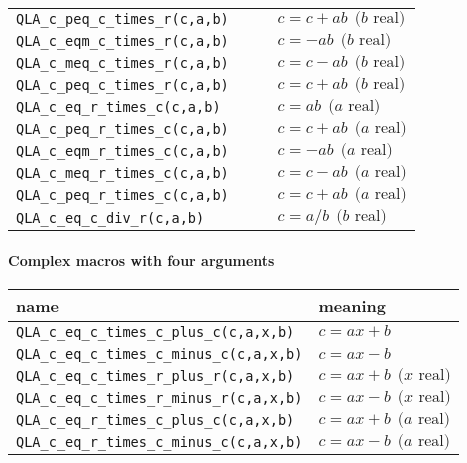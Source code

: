 \documentclass{article}
\begin{document}
\begin{center}
\begin{tabular}{|l|l|}
\verb|QLA_c_peq_c_times_r(c,a,b)    | & $ c = c + ab \ \ \mbox{($b$ real)}$ \\
\verb|QLA_c_eqm_c_times_r(c,a,b)    | & $ c = -ab \ \ \mbox{($b$ real)}   $ \\
\verb|QLA_c_meq_c_times_r(c,a,b)    | & $ c = c - ab \ \ \mbox{($b$ real)}$ \\
\verb|QLA_c_peq_c_times_r(c,a,b)    | & $ c = c + ab \ \ \mbox{($b$ real)}$ \\
\verb|QLA_c_eq_r_times_c(c,a,b)     | & $ c = ab \ \ \mbox{($a$ real)}    $ \\
\verb|QLA_c_peq_r_times_c(c,a,b)    | & $ c = c + ab \ \ \mbox{($a$ real)}$ \\
\verb|QLA_c_eqm_r_times_c(c,a,b)    | & $ c = -ab \ \ \mbox{($a$ real)}   $ \\
\verb|QLA_c_meq_r_times_c(c,a,b)    | & $ c = c - ab \ \ \mbox{($a$ real)}$ \\
\verb|QLA_c_peq_r_times_c(c,a,b)    | & $ c = c + ab \ \ \mbox{($a$ real)}$ \\
\verb|QLA_c_eq_c_div_r(c,a,b)       | & $ c = a/b \ \ \mbox{($b$ real)}   $ \\
\hline
\end{tabular}
\end{center}

\paragraph{Complex macros with four arguments}

\begin{center}
\begin{tabular}{|l|l|}
\hline
  name           & meaning      \\
\hline
\verb|QLA_c_eq_c_times_c_plus_c(c,a,x,b) | & $c = ax + b                   $\\
\verb|QLA_c_eq_c_times_c_minus_c(c,a,x,b)| & $c = ax - b                   $\\
\verb|QLA_c_eq_c_times_r_plus_r(c,a,x,b) | & $c = ax + b \ \ \mbox{($x$ real)}$\\
\verb|QLA_c_eq_c_times_r_minus_r(c,a,x,b)| & $c = ax - b \ \ \mbox{($x$ real)}$\\
\verb|QLA_c_eq_r_times_c_plus_c(c,a,x,b) | & $c = ax + b \ \ \mbox{($a$ real)}$\\
\verb|QLA_c_eq_r_times_c_minus_c(c,a,x,b)| & $c = ax - b \ \ \mbox{($a$ real)}$\\
\hline
\end{tabular}
\end{center}
\end{document}
